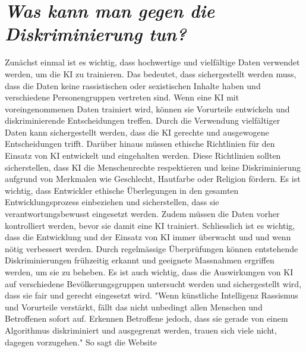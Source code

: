 \documentclass{article}
\begin{document}
\section{\textit{Was kann man gegen die Diskriminierung tun?}}
Zunächst einmal ist es wichtig, dass hochwertige und vielfältige Daten verwendet werden, um die KI zu trainieren. Das bedeutet, dass sichergestellt werden muss, dass die Daten keine rassistischen oder sexistischen Inhalte haben und verschiedene Personengruppen vertreten sind. Wenn eine KI mit voreingenommenen Daten trainiert wird, können sie Vorurteile entwickeln und diskriminierende Entscheidungen treffen. Durch die Verwendung vielfältiger Daten kann sichergestellt werden, dass die KI gerechte und ausgewogene Entscheidungen trifft. Darüber hinaus müssen ethische Richtlinien für den Einsatz von KI entwickelt und eingehalten werden. Diese Richtlinien sollten sicherstellen, dass KI die Menschenrechte respektieren und keine Diskriminierung aufgrund von Merkmalen wie Geschlecht, Hautfarbe oder Religion fördern. Es ist wichtig, dass Entwickler ethische Überlegungen in den gesamten Entwicklungsprozess einbeziehen und sicherstellen, dass sie verantwortungsbewusst eingesetzt werden. Zudem müssen die Daten vorher kontrolliert werden, bevor sie damit eine KI trainiert. Schliesslich ist es wichtig, dass die Entwicklung und der Einsatz von KI immer überwacht und und wenn nötig verbessert werden. Durch regelmässige Überprüfungen können entstehende Diskriminierungen frühzeitig erkannt und geeignete Massnahmen ergriffen werden, um sie zu beheben. Es ist auch wichtig, dass die Auswirkungen von KI auf verschiedene Bevölkerungsgruppen untersucht werden und sichergestellt wird, dass sie fair und gerecht eingesetzt wird. "Wenn künstliche Intelligenz Rassismus und Vorurteile verstärkt, fällt das nicht unbedingt allen Menschen und Betroffenen sofort auf. Erkennen Betroffene jedoch, dass sie gerade von einem Algorithmus diskriminiert und ausgegrenzt werden, trauen sich viele nicht, dagegen vorzugehen." So sagt die Website \citep{KI-Rassismus}
\end{document}
